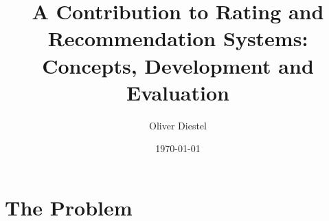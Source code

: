 \documentclass{beamer}
\begin{document}
\title{A Contribution to Rating and Recommendation Systems: Concepts, Development and Evaluation}   
\author{Oliver Diestel} 
\date{\today} 

\frame{\titlepage} 


\section{The Problem} 
\end{document}
